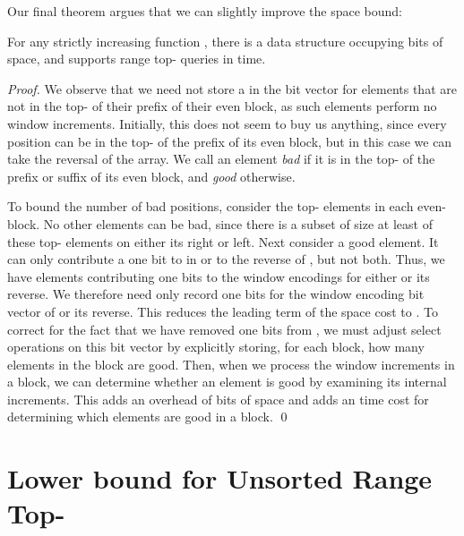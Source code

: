 \documentclass[runningheads]{llncs}
\begin{document}
Our final theorem argues that we can slightly improve the space bound:

\begin{theorem}
\label{thm:ds-final} 
For any strictly increasing function , there is a data structure
occupying  bits
of space, and supports range top- queries in  time.
\end{theorem}

\begin{proof}
We observe that we need not store a  in the bit vector
 for elements that are not in the top- of their
prefix of their even block, as such elements perform no window
increments.  Initially, this does not seem to buy us anything, since
every position can be in the top- of the prefix of its even block,
but in this case we can take the reversal of the array.  We call an
element \emph{bad} if it is in the top- of the prefix or suffix of
its even block, and \emph{good} otherwise.

To bound the number of bad positions, consider the top- elements
in each even-block.  No other elements can be bad, since there is a
subset of size at least  of these top- elements on either its
right or left.  Next consider a good element.  It can only contribute
a one bit to  in  or to the reverse of , but not
both.  Thus, we have  elements contributing  one bits to the window encodings for either  or its
reverse.  We therefore need only record  one bits for the window encoding
bit vector of  or its reverse.  This reduces the leading term of
the space cost to .  To correct for
the fact that we have removed one bits from , we must
adjust select operations on this bit vector by explicitly storing, for
each block, how many elements in the block are good.  Then, when we
process the window increments in a block, we can determine whether an
element is good by examining its internal increments.  This adds an
overhead of  bits of space and
adds an  time cost for determining which elements are good
in a block. \qed
\end{proof}






\newpage

\appendix

\section{\label{sec:reduction}Lower bound for Unsorted Range Top-\texorpdfstring{}{k}}
\end{document}
